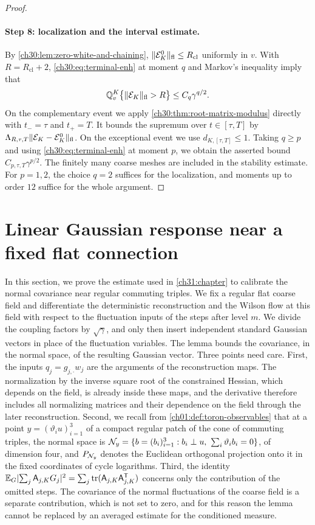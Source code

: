 \begin{proof}
\paragraph{Step 8: localization and the interval estimate.} By \cref{ch30:lem:zero-white-and-chaining}, $\lVert \mathcal E_K^0\rVert_{\mathrm{fl}}\le R_{\mathrm{cl}}$ uniformly in $v$. With $R=R_{\mathrm{cl}}+2$, \eqref{ch30:eq:terminal-enh} at moment $q$ and Markov's inequality imply that
\[
 \mathbb Q_v^K\bigl\{\lVert \mathcal E_K\rVert_{\mathrm{fl}}>R\bigr\}\le C_q\gamma^{q/2}.
\]
On the complementary event we apply \cref{ch30:thm:root-matrix-modulus} directly with $t_-=\tau$ and $t_+=T$. It bounds the supremum over $t\in[\tau,T]$ by $\Lambda_{R,\tau,T}\lVert \mathcal E_K-\mathcal E_K^0\rVert_{\mathrm{fl}}$. On the exceptional event we use $d_{K,[\tau,T]}\le1$. Taking $q\ge p$ and using \eqref{ch30:eq:terminal-enh} at moment $p$, we obtain the asserted bound $C_{p,\tau,T}\gamma^{p/2}$. The finitely many coarse meshes are included in the stability estimate. For $p=1,2$, the choice $q=2$ suffices for the localization, and moments up to order $12$ suffice for the whole argument.
\end{proof}

\section{Linear Gaussian response near a fixed flat connection}\label{ch30:sec:gaussian}

In this section, we prove the estimate used in \cref{ch31:chapter} to calibrate the normal covariance near regular commuting triples. We fix a regular flat coarse field and differentiate the deterministic reconstruction and the Wilson flow at this field with respect to the fluctuation inputs of the steps after level $m$. We divide the coupling factors by $\sqrt\gamma$, and only then insert independent standard Gaussian vectors in place of the fluctuation variables. The lemma bounds the covariance, in the normal space, of the resulting Gaussian vector. Three points need care. First, the inputs $q_j=g_{j,\cdot}w_j$ are the arguments of the reconstruction maps. The normalization by the inverse square root of the constrained Hessian, which depends on the field, is already inside these maps, and the derivative therefore includes all normalizing matrices and their dependence on the field through the later reconstruction. Second, we recall from \cref{ch01:def:toron-observables} that at a point $y=(\vartheta_iu)_{i=1}^3$ of a compact regular patch of the cone of commuting triples, the normal space is $\mathcal N_{y}=\{b=(b_i)_{i=1}^3:b_i\perp u,\ \sum_i\vartheta_ib_i=0\}$, of dimension four, and $P_{\mathcal N_{y}}$ denotes the Euclidean orthogonal projection onto it in the fixed coordinates of cycle logarithms. Third, the identity $\mathbb E_G\lvert \sum_j\mathsf A_{j,K}G_j\rvert^2=\sum_j\operatorname{tr}(\mathsf A_{j,K}\mathsf A_{j,K}^{\mathsf T})$ concerns only the contribution of the omitted steps. The covariance of the normal fluctuations of the coarse field is a separate contribution, which is not set to zero, and for this reason the lemma cannot be replaced by an averaged estimate for the conditioned measure.

